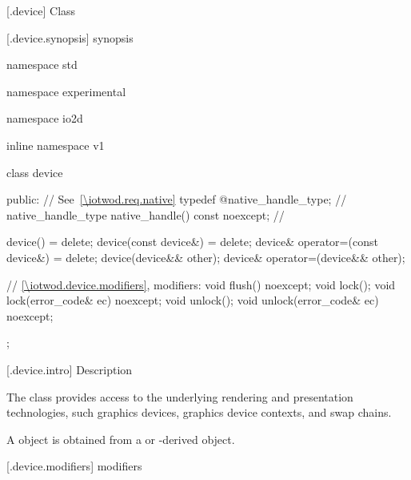  [\iotwod.device] {Class }

 [\iotwod.device.synopsis] { synopsis}

\begin{codeblock}
namespace std { namespace experimental { namespace io2d { inline namespace v1 {
  class device {
  public:
    // See~\ref{\iotwod.req.native}
    typedef @\impdef@ native_handle_type; //              \expos
    native_handle_type native_handle() const noexcept; // \expos

    device() = delete;
    device(const device&) = delete;
    device& operator=(const device&) = delete;
    device(device&& other);
    device& operator=(device&& other);

    // \ref{\iotwod.device.modifiers}, modifiers:
    void flush() noexcept;
    void lock();
    void lock(error_code& ec) noexcept;
    void unlock();
    void unlock(error_code& ec) noexcept;
  };
} } } }
\end{codeblock}

 [\iotwod.device.intro] { Description}

\pnum
{}
The  class provides access to the underlying rendering and 
presentation technologies, such graphics devices, graphics device contexts, and swap chains.

\pnum
A  object is obtained from a  or -derived object.

 [\iotwod.device.modifiers] { modifiers}

